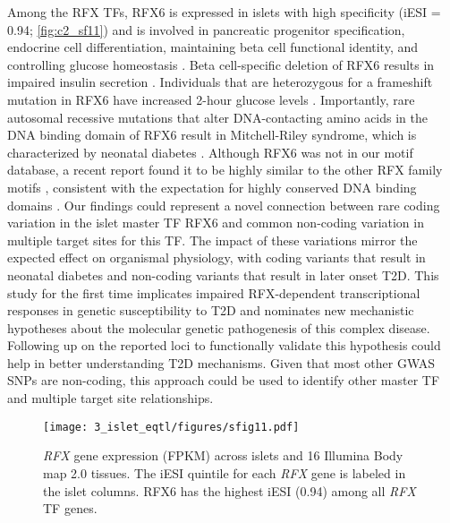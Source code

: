 Among the RFX TFs, RFX6 is expressed in islets with high specificity (iESI = 0.94; \ref{fig:c2_sf11}) and is involved in pancreatic progenitor specification, endocrine cell differentiation, maintaining beta cell functional identity, and controlling glucose homeostasis \cite{zhuGenomeEditingLineage2016, smithRfx6DirectsIslet2010, soyerRfx6Ngn3dependentWinged2010}. Beta cell-specific deletion of RFX6 results in impaired insulin secretion \cite{piccandRfx6MaintainsFunctional2014a, chandraRFX6RegulatesInsulin2014}. Individuals that are heterozygous for a frameshift mutation in RFX6 have increased 2-hour glucose levels \cite{huopioClinicalGeneticBiochemical2016}. Importantly, rare autosomal recessive mutations that alter DNA-contacting amino acids in the DNA binding domain of RFX6 result in Mitchell-Riley syndrome, which is characterized by neonatal diabetes \cite{smithRfx6DirectsIslet2010}. Although RFX6 was not in our motif database, a recent report found it to be highly similar to the other RFX family motifs \cite{lizioMappingMammalianCelltypespecific2015}, consistent with the expectation for highly conserved DNA binding domains \cite{aftabIdentificationCharacterizationNovel2008}. Our findings could represent a novel connection between rare coding variation in the islet master TF RFX6 \cite{soyerRfx6Ngn3dependentWinged2010, piccandRfx6MaintainsFunctional2014a} and common non-coding variation in multiple target sites for this TF. The impact of these variations mirror the expected effect on organismal physiology, with coding variants that result in neonatal diabetes and non-coding variants that result in later onset T2D. This study for the first time implicates impaired RFX-dependent transcriptional responses in genetic susceptibility to T2D and nominates new mechanistic hypotheses about the molecular genetic pathogenesis of this complex disease. Following up on the reported loci to functionally validate this hypothesis could help in better understanding T2D mechanisms. Given that most other GWAS SNPs are non-coding, this approach could be used to identify other master TF and multiple target site relationships.

\begin{figure}
    \centering
    \texttt{[image: 3\_islet\_eqtl/figures/sfig11.pdf]}
    \caption{\textit{RFX} gene expression (FPKM) across islets and 16 Illumina Body map 2.0 tissues. The iESI quintile for each \textit{RFX} gene is labeled in the islet columns. RFX6 has the highest iESI (0.94) among all \textit{RFX} TF genes.}
    \label{fig:c2_sf1}
\end{figure}

